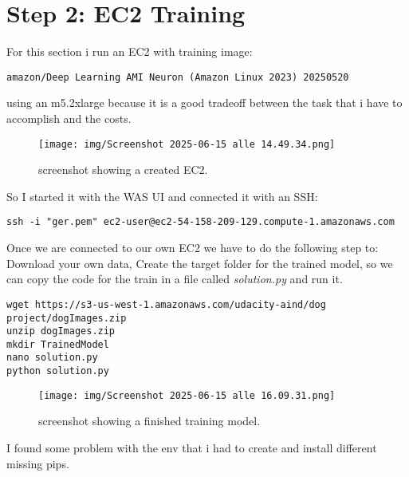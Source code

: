\documentclass[12pt,a4paper]{article}
\begin{document}
\section{Step 2: EC2 Training}
For this section i run an EC2 with training image: 
\begin{verbatim}amazon/Deep Learning AMI Neuron (Amazon Linux 2023) 20250520\end{verbatim} using an m5.2xlarge because it is a good tradeoff between the task that i have to accomplish and the costs. 

\begin{figure}[htbp]
  \centering
  \texttt{[image: img/Screenshot 2025-06-15 alle 14.49.34.png]}
  \caption{screenshot showing a created EC2.}
  \label{fig:example}
\end{figure}

So I started it with the WAS UI and connected it with an SSH:
\begin{verbatim}ssh -i "ger.pem" ec2-user@ec2-54-158-209-129.compute-1.amazonaws.com\end{verbatim}

Once we are connected to our own EC2 we have to do the following step to: Download your own data, Create the target folder for the trained model, so we can copy the code for the train in a file called \textit{solution.py} and run it.  

\begin{verbatim}
wget https://s3-us-west-1.amazonaws.com/udacity-aind/dog project/dogImages.zip
unzip dogImages.zip
mkdir TrainedModel 
nano solution.py
python solution.py
\end{verbatim}

\begin{figure}[htbp]
  \centering
  \texttt{[image: img/Screenshot 2025-06-15 alle 16.09.31.png]}
  \caption{screenshot showing a finished training model.}
  \label{fig:example}
\end{figure}

I found some problem with the env that i had to create and install different missing pips.
\end{document}
